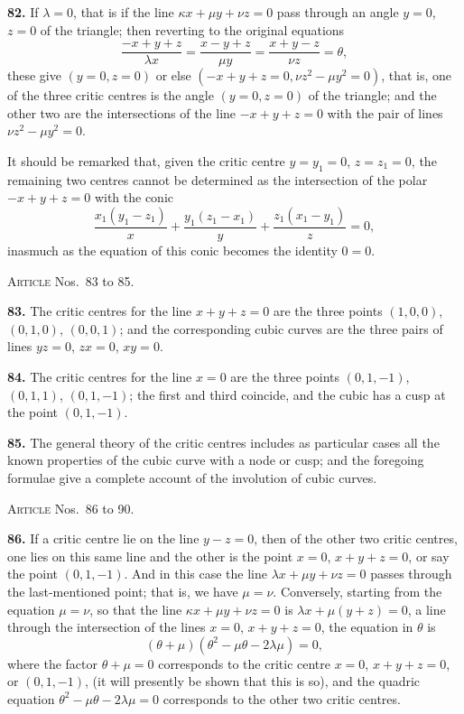 \documentclass[11pt,a4paper]{article}
\theoremstyle{plain}
\theoremstyle{definition}
\begin{document}
\textbf{82.} If $\lambda = 0$, that is if the line $\kappa x + \mu y + \nu z = 0$ pass through an angle $y = 0$, $z = 0$ of the triangle; then reverting to the original equations
\[
\frac{-x + y + z}{\lambda x} = \frac{x - y + z}{\mu y} = \frac{x + y - z}{\nu z} = \theta,
\]
these give $(y = 0, z = 0)$ or else $(-x + y + z = 0, \nu z^2 - \mu y^2 = 0)$, that is, one of the three critic centres is the angle $(y = 0, z = 0)$ of the triangle; and the other two are the intersections of the line $-x + y + z = 0$ with the pair of lines $\nu z^2 - \mu y^2 = 0$.

It should be remarked that, given the critic centre $y = y_1 = 0$, $z = z_1 = 0$, the remaining two centres cannot be determined as the intersection of the polar $-x + y + z = 0$ with the conic
\[
\frac{x_1(y_1 - z_1)}{x} + \frac{y_1(z_1 - x_1)}{y} + \frac{z_1(x_1 - y_1)}{z} = 0,
\]
inasmuch as the equation of this conic becomes the identity $0 = 0$.

\bigskip

\noindent\textsc{Article} Nos.~83 to 85.

\medskip

\textbf{83.} The critic centres for the line $x + y + z = 0$ are the three points $(1, 0, 0)$, $(0, 1, 0)$, $(0, 0, 1)$; and the corresponding cubic curves are the three pairs of lines $yz = 0$, $zx = 0$, $xy = 0$.

\textbf{84.} The critic centres for the line $x = 0$ are the three points $(0, 1, -1)$, $(0, 1, 1)$, $(0, 1, -1)$; the first and third coincide, and the cubic has a cusp at the point $(0, 1, -1)$.

\textbf{85.} The general theory of the critic centres includes as particular cases all the known properties of the cubic curve with a node or cusp; and the foregoing formulae give a complete account of the involution of cubic curves.

\bigskip

\noindent\textsc{Article} Nos.~86 to 90.

\medskip

\textbf{86.} If a critic centre lie on the line $y - z = 0$, then of the other two critic centres, one lies on this same line and the other is the point $x = 0$, $x + y + z = 0$, or say the point $(0, 1, -1)$. And in this case the line $\lambda x + \mu y + \nu z = 0$ passes through the last-mentioned point; that is, we have $\mu = \nu$. Conversely, starting from the equation $\mu = \nu$, so that the line $\kappa x + \mu y + \nu z = 0$ is $\lambda x + \mu(y + z) = 0$, a line through the intersection of the lines $x = 0$, $x + y + z = 0$, the equation in $\theta$ is
\[
(\theta + \mu)(\theta^2 - \mu\theta - 2\lambda\mu) = 0,
\]
where the factor $\theta + \mu = 0$ corresponds to the critic centre $x = 0$, $x + y + z = 0$, or $(0, 1, -1)$, (it will presently be shown that this is so), and the quadric equation $\theta^2 - \mu\theta - 2\lambda\mu = 0$ corresponds to the other two critic centres.
\end{document}
